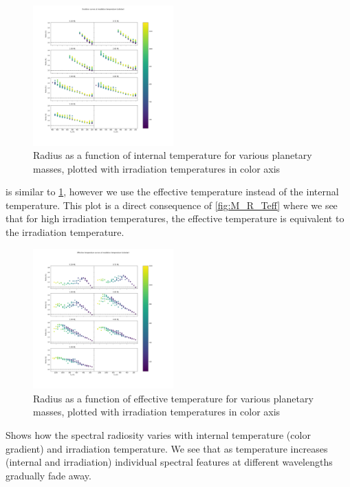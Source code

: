 \begin{figure}
    \centering
    \includegraphics[width=0.48\textwidth]{Images/T_int_R_Tirr.png}
    \caption{Radius as a function of internal temperature for various planetary masses, plotted with irradiation temperatures in color axis}
    \label{fig:T_int_R_Tirr}
\end{figure}

 is similar to \cref{fig:T_int_R_Tirr}, however we use the effective temperature instead of the internal temperature. This plot is a direct consequence of \cref{fig:M_R_Teff} where we see that for high irradiation temperatures, the effective temperature is equivalent to the irradiation temperature. \par

\begin{figure}
    \centering
    \includegraphics[width=0.48\textwidth]{Images/T_eff_R_Tirr.png}
    \caption{Radius as a function of effective temperature for various planetary masses, plotted with irradiation temperatures in color axis}
    \label{fig:T_eff_R_Tirr}
\end{figure}

 Shows how the spectral radiosity varies with internal temperature (color gradient) and irradiation temperature. We see that as temperature increases (internal and irradiation) individual spectral features at different wavelengths gradually fade away. \par

